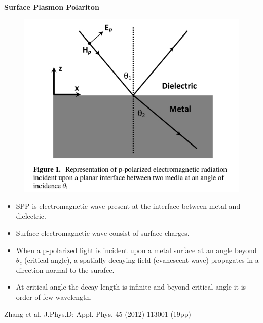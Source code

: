 \documentclass[9pt,aspectratio94]{beamer}
\begin{document}
\begin{frame}{\textbf{Surface Plasmon Polariton}}
\begin{figure}
    \centering
    \includegraphics[scale=0.6]{zhang2012 (1)-3_cropped_page-0001.jpg}
\end{figure}
\begin{itemize}
   \item SPP is electromagnetic wave present at the interface between metal and dielectric.
   \item Surface electromagnetic wave consist of  surface charges.
   \item When a p-polarized light is incident upon a metal surface at an angle beyond $\theta_{c}$ (critical angle), a spatially decaying field (evanescent wave) propagates in a direction normal to the surafce.
   \item At critical angle the decay length is infinite and beyond critical angle it is order of few wavelength.
\end{itemize}
 \tiny{Zhang et al. J.Phys.D: Appl. Phys. 45 (2012) 113001 (19pp)}   
\end{frame}
\end{document}
